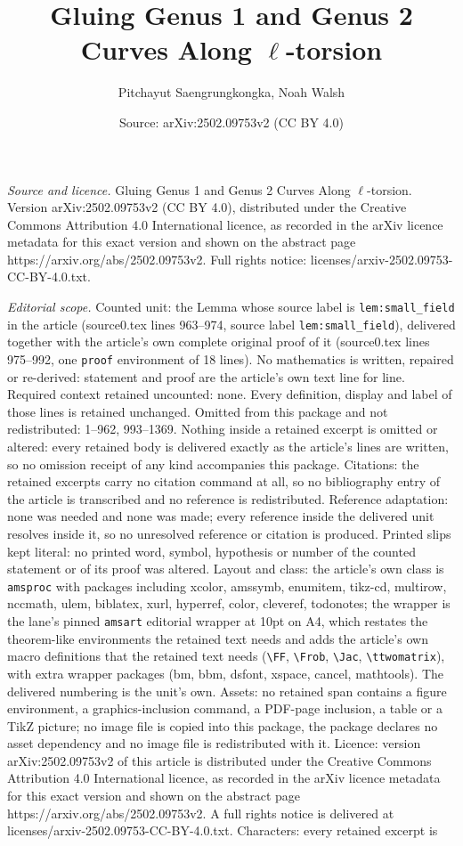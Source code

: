 \documentclass[10pt,a4paper]{amsart}
\title[Gluing Genus 1 and Genus 2 Curves Along $\ell$-torsion]{Gluing Genus 1 and Genus 2 Curves Along $\ell$-torsion}
\author{Pitchayut Saengrungkongka, Noah Walsh}
\date{Source: arXiv:2502.09753v2 (CC BY 4.0)}
\begin{document}
\maketitle

\noindent\emph{Source and licence.} Gluing Genus 1 and Genus 2 Curves Along $\ell$-torsion. Version arXiv:2502.09753v2 (CC BY 4.0), distributed under the Creative Commons Attribution 4.0 International licence, as recorded in the arXiv licence metadata for this exact version and shown on the abstract page https://arxiv.org/abs/2502.09753v2. Full rights notice: licenses/arxiv-2502.09753-CC-BY-4.0.txt.\par\smallskip

\noindent\textit{Editorial scope.} Counted unit: the Lemma whose source label is \texttt{lem:small\_field} in the article (source0.tex lines 963--974, source label \texttt{lem:small\_field}), delivered together with the article's own complete original proof of it (source0.tex lines 975--992, one \texttt{proof} environment of 18 lines). No mathematics is written, repaired or re-derived: statement and proof are the article's own text line for line. Required context retained uncounted: none. Every definition, display and label of those lines is retained unchanged. Omitted from this package and not redistributed: 1--962, 993--1369. Nothing inside a retained excerpt is omitted or altered: every retained body is delivered exactly as the article's lines are written, so no omission receipt of any kind accompanies this package. Citations: the retained excerpts carry no citation command at all, so no bibliography entry of the article is transcribed and no reference is redistributed. Reference adaptation: none was needed and none was made; every reference inside the delivered unit resolves inside it, so no unresolved reference or citation is produced. Printed slips kept literal: no printed word, symbol, hypothesis or number of the counted statement or of its proof was altered. Layout and class: the article's own class is \texttt{amsproc} with packages including xcolor, amssymb, enumitem, tikz-cd, multirow, nccmath, ulem, biblatex, xurl, hyperref, color, cleveref, todonotes; the wrapper is the lane's pinned \texttt{amsart} editorial wrapper at 10pt on A4, which restates the theorem-like environments the retained text needs and adds the article's own macro definitions that the retained text needs (\texttt{\textbackslash FF}, \texttt{\textbackslash Frob}, \texttt{\textbackslash Jac}, \texttt{\textbackslash ttwomatrix}), with extra wrapper packages (bm, bbm, dsfont, xspace, cancel, mathtools). The delivered numbering is the unit's own. Assets: no retained span contains a figure environment, a graphics-inclusion command, a PDF-page inclusion, a table or a TikZ picture; no image file is copied into this package, the package declares no asset dependency and no image file is redistributed with it. Licence: version arXiv:2502.09753v2 of this article is distributed under the Creative Commons Attribution 4.0 International licence, as recorded in the arXiv licence metadata for this exact version and shown on the abstract page https://arxiv.org/abs/2502.09753v2. A full rights notice is delivered at licenses/arxiv-2502.09753-CC-BY-4.0.txt. Characters: every retained excerpt is 
\end{document}
